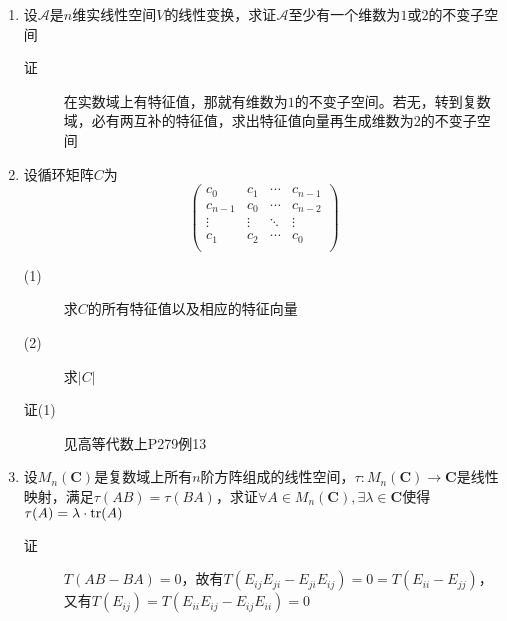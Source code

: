 \begin{enumerate}
\item 设$\mathcal{A}$是$n$维实线性空间$V$的线性变换，求证$\mathcal{A}$至少有一个维数为$1$或$2$的不变子空间
\begin{description}
\item[证] 在实数域上有特征值，那就有维数为$1$的不变子空间。若无，转到复数域，必有两互补的特征值，求出特征值向量再生成维数为$2$的不变子空间
\end{description}

\item 设循环矩阵$C$为
\[
\left(
\begin{array}{cccc}
c_0 & c_1 & \cdots & c_{n-1} \\
c_{n-1} & c_0 & \cdots & c_{n-2} \\
\vdots & \vdots & \ddots & \vdots\\
c_1 & c_2 & \cdots & c_0 \\
\end{array} \right)
\]
\begin{description}
\item[(1)] 求$C$的所有特征值以及相应的特征向量
\item[(2)] 求$|C|$
\item[证(1)] 见高等代数上P279例13
\end{description}

\item 设$M_n(\mathbf{C})$是复数域上所有$n$阶方阵组成的线性空间，$\tau:M_n(\mathbf{C})\rightarrow \mathbf{C}$是线性映射，满足$\tau(AB)=\tau(BA)$，求证$\forall A \in M_n(\mathbf{C}),\exists \lambda \in \mathbf{C}$使得$\tau(A) = \lambda\cdot\operatorname{tr}(A)$
\begin{description}
\item[证] $T(AB-BA)=0$，故有$T(E_{ij}E_{ji}-E_{ji}E_{ij})=0=T(E_{ii}-E_{jj})$，又有$T(E_{ij})=T(E_{ii}E_{ij}-E_{ij}E_{ii})=0$
\end{description}











\end{enumerate}